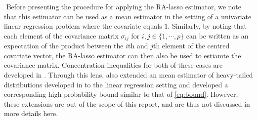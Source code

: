 $ $\newline
Before presenting the procedure for applying the RA-lasso estimator, we note that this estimator can be used as a mean estimator in the setting of a univariate linear regression problem where the covariate equals $1$. Similarly, by noting that each element of the covariance matrix $\sigma_{ij}$ for $i,j\in\{1,\cdots,p\}$ can be written as an expectation of the product between the $i$th and $j$th element of the centred covariate vector, the RA-lasso estimator can then also be used to estiamte the covariance matrix. Concentration inequalities for both of these cases are developed in \citet{fan2017estimation}. Through this lens, \citet{fan2017estimation} also extended an mean estimator of heavy-tailed distributions developed in \citet{catoni2012challenging} to the linear regression setting and developed a corresponding high probability bound similar to that of \cref{eq:bound}. However, these extensions are out of the scope of this report, and are thus not discussed in more details here.

